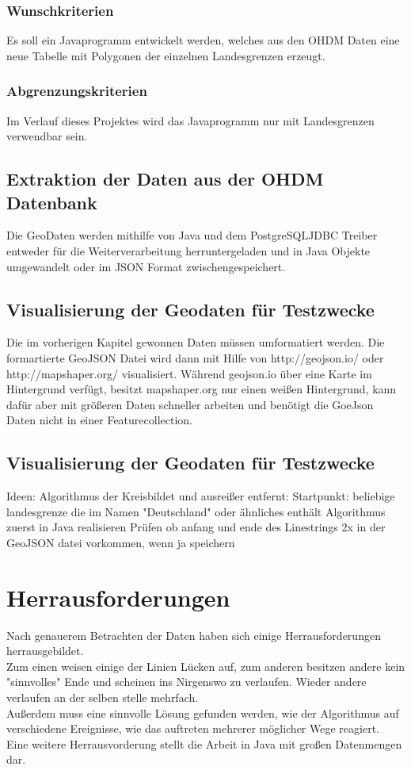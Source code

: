 \documentclass[a4paper, 12pt]{article}
\begin{document}
\subsubsection{Wunschkriterien}
Es soll ein Javaprogramm entwickelt werden, welches aus den OHDM Daten eine neue Tabelle mit Polygonen der einzelnen Landesgrenzen erzeugt.\\
\subsubsection{Abgrenzungskriterien}
Im Verlauf dieses Projektes wird das Javaprogramm nur mit Landesgrenzen verwendbar sein.\\
\subsection{Extraktion der Daten aus der OHDM Datenbank}
Die GeoDaten werden mithilfe von Java und dem PostgreSQLJDBC Treiber entweder für die Weiterverarbeitung herruntergeladen und in Java Objekte umgewandelt oder im JSON Format zwischengespeichert\cite{jdbc}.
\subsection{Visualisierung der Geodaten für Testzwecke}
Die im vorherigen Kapitel gewonnen Daten müssen umformatiert werden.
Die formartierte GeoJSON Datei wird dann mit Hilfe von http://geojson.io/ oder http://mapshaper.org/ visualisiert.
Wäh­rend geojson.io über eine Karte im Hintergrund verfügt, besitzt mapshaper.org nur einen weißen Hintergrund, kann dafür aber mit größeren Daten schneller arbeiten und benötigt die GoeJson Daten nicht in einer Featurecollection.
\subsection{Visualisierung der Geodaten für Testzwecke}
Ideen: Algorithmus der Kreisbildet und ausreißer entfernt: Startpunkt: beliebige landesgrenze die im Namen "Deutschland" oder ähnliches enthält
Algorithmus zuerst in Java realisieren
Prüfen ob anfang und ende des Linestrings 2x in der GeoJSON datei vorkommen, wenn ja speichern
\section{Herrausforderungen}
Nach genauerem Betrachten der Daten haben sich einige Herrausforderungen herrausgebildet.\\
Zum einen weisen einige der Linien Lücken auf, zum anderen besitzen andere kein "sinnvolles" Ende und scheinen ins Nirgenswo zu verlaufen. Wieder andere verlaufen an der selben stelle mehrfach. \\
Außerdem muss eine sinnvolle Lösung gefunden werden, wie der Algorithmus auf verschiedene Ereignisse, wie das auftreten mehrerer möglicher Wege reagiert.\\
Eine weitere Herrausvorderung stellt die Arbeit in Java mit großen Datenmengen dar.\\
\end{document}
